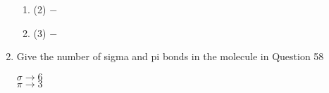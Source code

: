 \documentclass[12pt]{article}
\begin{document}
\begin{enumerate}
\begin{enumerate}
      \item {} (2) $-$ 

      \item {} (3) $-$ 

    \end{enumerate}

    \setcounter{enumi}{63}

  \item Give the number of sigma and pi bonds in the molecule in Question 58

    \begin{center}
      $\sigma\longrightarrow6$\\
      $\pi\longrightarrow3$
    \end{center}

\end{enumerate}
\end{document}
